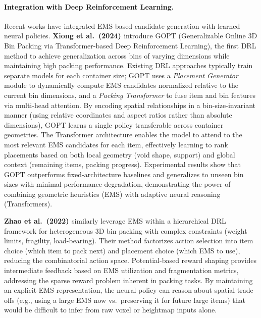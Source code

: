\paragraph{Integration with Deep Reinforcement Learning.}
Recent works have integrated EMS-based candidate generation with learned neural policies. \textbf{Xiong et al.\ (2024) \cite{XGPDCBX24}} introduce GOPT (Generalizable Online 3D Bin Packing via Transformer-based Deep Reinforcement Learning), the first DRL method to achieve generalization across bins of varying dimensions while maintaining high packing performance. Existing DRL approaches typically train separate models for each container size; GOPT uses a \textit{Placement Generator} module to dynamically compute EMS candidates normalized relative to the current bin dimensions, and a \textit{Packing Transformer} to fuse item and bin features via multi-head attention. By encoding spatial relationships in a bin-size-invariant manner (using relative coordinates and aspect ratios rather than absolute dimensions), GOPT learns a single policy transferable across container geometries. The Transformer architecture enables the model to attend to the most relevant EMS candidates for each item, effectively learning to rank placements based on both local geometry (void shape, support) and global context (remaining items, packing progress). Experimental results show that GOPT outperforms fixed-architecture baselines and generalizes to unseen bin sizes with minimal performance degradation, demonstrating the power of combining geometric heuristics (EMS) with adaptive neural reasoning (Transformers).

\textbf{Zhao et al.\ (2022) \cite{ZXL+22}} similarly leverage EMS within a hierarchical DRL framework for heterogeneous 3D bin packing with complex constraints (weight limits, fragility, load-bearing). Their method factorizes action selection into item choice (which item to pack next) and placement choice (which EMS to use), reducing the combinatorial action space. Potential-based reward shaping provides intermediate feedback based on EMS utilization and fragmentation metrics, addressing the sparse reward problem inherent in packing tasks. By maintaining an explicit EMS representation, the neural policy can reason about spatial trade-offs (e.g., using a large EMS now vs.\ preserving it for future large items) that would be difficult to infer from raw voxel or heightmap inputs alone.

